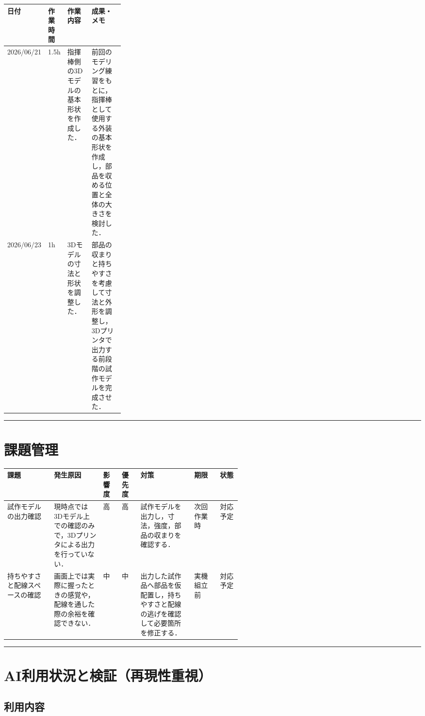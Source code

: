\documentclass[uplatex,dvipdfmx,a4paper,11pt]{jsarticle}
\newcommand{\sectionrule}{\par\medskip\noindent\rule{\linewidth}{0.6pt}\par\medskip}
\begin{document}
\begin{tabularx}{\linewidth}{@{}p{0.16\linewidth}p{0.12\linewidth}XX@{}}
\toprule
日付 & 作業時間 & 作業内容 & 成果・メモ \\
\midrule
2026/06/21 & 1.5h & 指揮棒側の3Dモデルの基本形状を作成した． & 前回のモデリング練習をもとに，指揮棒として使用する外装の基本形状を作成し，部品を収める位置と全体の大きさを検討した． \\
2026/06/23 & 1h & 3Dモデルの寸法と形状を調整した． & 部品の収まりと持ちやすさを考慮して寸法と外形を調整し，3Dプリンタで出力する前段階の試作モデルを完成させた． \\
\bottomrule
\end{tabularx}

\sectionrule

\section{課題管理}

\begin{tabularx}{\linewidth}{@{}p{0.20\linewidth}Xp{0.08\linewidth}p{0.08\linewidth}Xp{0.11\linewidth}p{0.09\linewidth}@{}}
\toprule
課題 & 発生原因 & 影響度 & 優先度 & 対策 & 期限 & 状態 \\
\midrule
試作モデルの出力確認 & 現時点では3Dモデル上での確認のみで，3Dプリンタによる出力を行っていない． & 高 & 高 & 試作モデルを出力し，寸法，強度，部品の収まりを確認する． & 次回作業時 & 対応予定 \\
持ちやすさと配線スペースの確認 & 画面上では実際に握ったときの感覚や，配線を通した際の余裕を確認できない． & 中 & 中 & 出力した試作品へ部品を仮配置し，持ちやすさと配線の逃げを確認して必要箇所を修正する． & 実機組立前 & 対応予定 \\
\bottomrule
\end{tabularx}

\sectionrule

\section{AI利用状況と検証（再現性重視）}

\subsection{利用内容}
\end{document}
